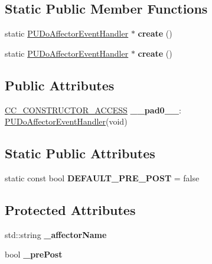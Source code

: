 \subsection*{Static Public Member Functions}
\begin{DoxyCompactItemize}
\item 
\mbox{\label{classPUDoAffectorEventHandler_a7ea443743ee26bf920b0e67c3a2fe4c9}} 
static \hyperlink{classPUDoAffectorEventHandler}{P\+U\+Do\+Affector\+Event\+Handler} $\ast$ {\bfseries create} ()
\item 
\mbox{\label{classPUDoAffectorEventHandler_a737f1a3c7bc61d6716847aaa74e8be51}} 
static \hyperlink{classPUDoAffectorEventHandler}{P\+U\+Do\+Affector\+Event\+Handler} $\ast$ {\bfseries create} ()
\end{DoxyCompactItemize}
\subsection*{Public Attributes}
\begin{DoxyCompactItemize}
\item 
\mbox{\label{classPUDoAffectorEventHandler_ae013ce870479615f91616785ffc123ec}} 
\hyperlink{_2cocos2d_2cocos_2base_2ccConfig_8h_a25ef1314f97c35a2ed3d029b0ead6da0}{C\+C\+\_\+\+C\+O\+N\+S\+T\+R\+U\+C\+T\+O\+R\+\_\+\+A\+C\+C\+E\+SS} {\bfseries \+\_\+\+\_\+pad0\+\_\+\+\_\+}\+: \hyperlink{classPUDoAffectorEventHandler}{P\+U\+Do\+Affector\+Event\+Handler}(void)
\end{DoxyCompactItemize}
\subsection*{Static Public Attributes}
\begin{DoxyCompactItemize}
\item 
\mbox{\label{classPUDoAffectorEventHandler_ac12eafc0e45dbbd441919e55e5cf3471}} 
static const bool {\bfseries D\+E\+F\+A\+U\+L\+T\+\_\+\+P\+R\+E\+\_\+\+P\+O\+ST} = false
\end{DoxyCompactItemize}
\subsection*{Protected Attributes}
\begin{DoxyCompactItemize}
\item 
\mbox{\label{classPUDoAffectorEventHandler_a2d597ec31a16fb96f6e9cb9b3af2eee8}} 
std\+::string {\bfseries \+\_\+affector\+Name}
\item 
\mbox{\label{classPUDoAffectorEventHandler_a3c387591ea73dda5ec11944ddef18ddf}} 
bool {\bfseries \+\_\+pre\+Post}
\end{DoxyCompactItemize}
